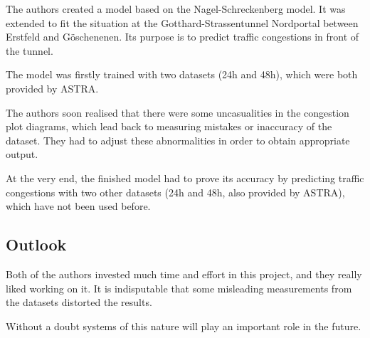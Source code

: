 The authors created a model based on the Nagel-Schreckenberg model. It was extended to fit the situation at the
Gotthard-Strassentunnel Nordportal between Erstfeld and Göschenenen. Its purpose is to predict traffic congestions in
front of the tunnel.

The model was firstly trained with two datasets (24h and 48h), which were both provided by ASTRA.

The authors soon realised that there were some uncasualities in the congestion plot diagrams, which lead back to
measuring mistakes or inaccuracy of the dataset. They had to adjust these abnormalities in order to obtain appropriate output.

At the very end, the finished model had to prove its accuracy by predicting traffic congestions with two other datasets
(24h and 48h, also provided by ASTRA), which have not been used before.


\subsection{Outlook}
Both of the authors invested much time and effort in this project, and they really liked working on it. It is indisputable
that some misleading measurements from the datasets distorted the results.

Without a doubt systems of this nature will play an important role in the future.

